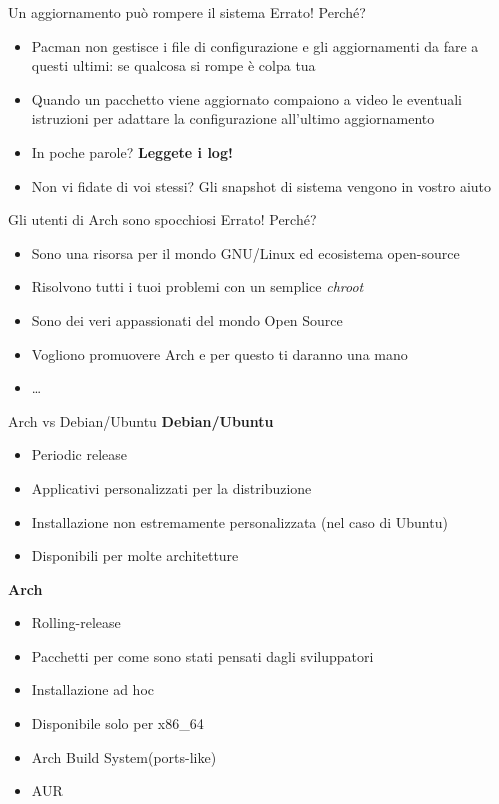 
\begin{frame}{Un aggiornamento può rompere il sistema}
    \alert{Errato!} Perché?
    \begin{itemize}
        \item Pacman non gestisce i file di configurazione e gli aggiornamenti da fare a questi ultimi: se qualcosa si rompe è colpa tua
        \item Quando un pacchetto viene aggiornato compaiono a video le eventuali istruzioni per adattare la configurazione all'ultimo aggiornamento 
        \item In poche parole? \textbf{Leggete i log!}
        \item Non vi fidate di voi stessi? Gli snapshot di sistema vengono in vostro aiuto
    \end{itemize}
\end{frame}


\begin{frame}{Gli utenti di Arch sono spocchiosi}
    \alert{Errato!} Perché?
    \begin{itemize}
        \item Sono una risorsa per il mondo GNU/Linux ed ecosistema open-source
        \item Risolvono tutti i tuoi problemi con un semplice \textit{chroot}
        \item Sono dei veri appassionati del mondo Open Source
        \item Vogliono promuovere Arch e per questo ti daranno una mano
        \item \dots
    \end{itemize}
\end{frame}


\begin{frame}{Arch vs Debian/Ubuntu}
    \textbf{Debian/Ubuntu}
    \begin{itemize}
        \item Periodic release
        \item Applicativi personalizzati per la distribuzione
        \item Installazione non estremamente personalizzata (nel caso di Ubuntu)
        \item Disponibili per molte architetture
    \end{itemize}

    \textbf{Arch}
    \begin{itemize}
        \item Rolling-release
        \item Pacchetti per come sono stati pensati dagli sviluppatori
        \item Installazione ad hoc
        \item Disponibile solo per x86\_64
        \item Arch Build System(ports-like)
        \item AUR
    \end{itemize}
\end{frame}

